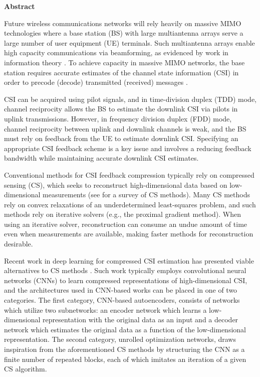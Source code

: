\newpage
{\baselineskip 14pt   } \vspace{27pt}
\centerline{\Huge \bf {Abstract}} \vspace{18pt}

Future wireless communications networks will rely heavily on massive MIMO technologies where a base station (BS) with large multiantenna arrays serve a large number of user equipment (UE) terminals. Such multiantenna arrays enable high capacity communications via beamforming, as evidenced by work in information theory \cite{ref:goldsmith2003capacity}. To achieve capacity in massive MIMO networks, the base station requires accurate estimates of the channel state information (CSI) in order to precode (decode) transmitted (received) messages \cite{ref:marzetta2016fundamentals}.

CSI can be acquired using pilot signals, and in time-division duplex (TDD) mode, channel reciprocity allows the BS to estimate the downlink CSI via pilots in uplink transmissions. However, in frequency division duplex (FDD) mode, channel reciprocity between uplink and downlink channels is weak, and the BS must rely on feedback from the UE to estimate downlink CSI. Specifying an appropriate CSI feedback scheme is a key issue and involves a reducing feedback bandwidth while maintaining accurate downlink CSI estimates.

Conventional methods for CSI feedback compression typically rely on compressed sensing (CS), which seeks to reconstruct high-dimensional data based on low-dimensional measurements (see \cite{ref:Marques2019ReviewOfSparseRecovery} for a survey of CS methods). Many CS methods rely on convex relaxations of an underdetermined least-squares problem, and such methods rely on iterative solvers (e.g., the proximal gradient method). When using an iterative solver, reconstruction can consume an undue amount of time even when measurements are available, making faster methods for reconstruction desirable.

Recent work in deep learning for compressed CSI estimation has presented viable alternatives to CS methods \cite{ref:csinet}. Such work typically employs convolutional neural networks (CNNs) to learn compressed representations of high-dimensional CSI, and the architectures used in CNN-based works can be placed in one of two categories. The first category, CNN-based autoencoders, consists of networks which utilize two subnetworks: an encoder network which learns a low-dimensional representation with the original data as an input and a decoder network which estimates the original data as a function of the low-dimensional representation. The second category, unrolled optimization networks, draws inspiration from the aforementioned CS methods by structuring the CNN as a finite number of repeated blocks, each of which imitates an iteration of a given CS algorithm.

